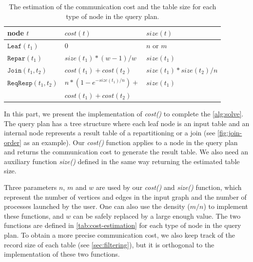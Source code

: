 \documentclass{sokendai_thesis} %
\begin{document}
\begin{table}[t]
\centering
\caption{The estimation of the communication cost and the table size for each type of node in the query plan.}
\label{tab:cost-estimation}
\begin{tabular}{lll}
\hline
node $t$ & $cost(t)$ & $size(t)$ \\
\hline
$\texttt{Leaf}(t_1)$ & 0 & $n$ or $m$ \\
$\texttt{Repar}(t_1)$ & $\mathit{size}(t_1)*(w-1)/w$ & $\mathit{size}(t_1)$ \\
$\texttt{Join}(t_1,t_2)$ & $\mathit{cost}(t_1)+\mathit{cost}(t_2)$ & $\mathit{size}(t_1)*\mathit{size}(t_2)/n$ \\
\hline
$\texttt{ReqResp}(t_1,t_2)$ & $n*(1-e^{-\mathit{size}(t_1)/n})+$ & $\mathit{size}(t_1)$ \\
& $\mathit{cost}(t_1)+\mathit{cost}(t_2)$ & \\
\hline
\end{tabular}
\end{table}

In this part, we present the implementation of \textit{cost()} to complete the \autoref{alg:solve}.
The query plan has a tree structure where each leaf node is an input table and an internal node represents a result table of a repartitioning or a join (see \autoref{fig:join-order} as an example).
Our \textit{cost()} function applies to a node in the query plan and returns the communication cost to generate the result table.
We also need an auxiliary function \textit{size()} defined in the same way returning the estimated table size.

Three parameters $n$, $m$ and $w$ are used by our \textit{cost()} and \textit{size()} function, which represent the number of vertices and edges in the input graph and the number of processes launched by the user.
One can also use the density ($m/n$) to implement these functions, and $w$ can be safely replaced by a large enough value.
The two functions are defined in \autoref{tab:cost-estimation} for each type of node in the query plan.
To obtain a more precise communication cost, we also keep track of the record size of each table (see \autoref{sec:filtering}), but it is orthogonal to the implementation of these two functions.
\end{document}
